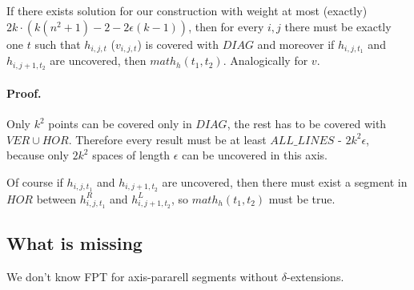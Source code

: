 \begin{lemma}
	\label{main_soundness_construction}
	If there exists solution for our construction
	with weight at most (exactly)
	$2k \cdot (k(n^2+1) - 2 - 2\epsilon(k-1))$,
	then for every $i, j$
	there must be exactly one $t$ such that $h_{i, j, t}$
	($v_{i, j, t}$) 
	is covered with $DIAG$
	and moreover if $h_{i, j, t_1}$ and $h_{i, j+1, t_2}$
	are uncovered, then $math_h(t_1, t_2)$.
	Analogically for $v$.
\end{lemma}
\paragraph{Proof.}
Only $k^2$ points can be covered only in $DIAG$, the rest
has to be covered with $VER \cup HOR$.
Therefore every result must be at least $ALL\_LINES$ - $2k^2\epsilon$,
because only $2k^2$ spaces of length $\epsilon$
can be uncovered in this axis.

Of course if $h_{i, j, t_1}$ and $h_{i, j+1, t_2}$
are uncovered, then there must exist
a segment in $HOR$ between $h^R_{i, j, t_1}$ and $h^L_{i, j+1, t_2}$,
so $math_h(t_1, t_2)$ must be true.



\subsection{What is missing}
We don't know FPT for axis-pararell segments without $\delta$-extensions.
